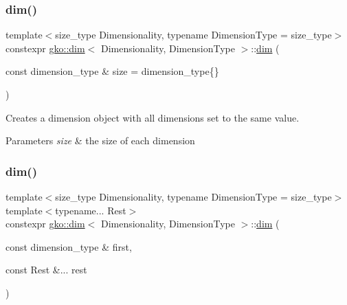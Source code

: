 \subsubsection{\texorpdfstring{dim()}{dim()}\hspace{0.1cm}{\footnotesize\ttfamily [1/2]}}
{\footnotesize\ttfamily template$<$size\+\_\+type Dimensionality, typename Dimension\+Type = size\+\_\+type$>$ \\
constexpr \hyperlink{structgko_1_1dim}{gko\+::dim}$<$ Dimensionality, Dimension\+Type $>$\+::\hyperlink{structgko_1_1dim}{dim} (\begin{DoxyParamCaption}\item[{const dimension\+\_\+type \&}]{size = {\ttfamily dimension\+\_\+type\{\}} }\end{DoxyParamCaption})\hspace{0.3cm}{\ttfamily [inline]}}



Creates a dimension object with all dimensions set to the same value. 


\begin{DoxyParams}{Parameters}
{\em size} & the size of each dimension \\
\hline
\end{DoxyParams}
\mbox{\label{structgko_1_1dim_a09b90cec3c5778596ef75bed95ab8850}} 
\subsubsection{\texorpdfstring{dim()}{dim()}\hspace{0.1cm}{\footnotesize\ttfamily [2/2]}}
{\footnotesize\ttfamily template$<$size\+\_\+type Dimensionality, typename Dimension\+Type = size\+\_\+type$>$ \\
template$<$typename... Rest$>$ \\
constexpr \hyperlink{structgko_1_1dim}{gko\+::dim}$<$ Dimensionality, Dimension\+Type $>$\+::\hyperlink{structgko_1_1dim}{dim} (\begin{DoxyParamCaption}\item[{const dimension\+\_\+type \&}]{first,  }\item[{const Rest \&...}]{rest }\end{DoxyParamCaption})\hspace{0.3cm}{\ttfamily [inline]}}



